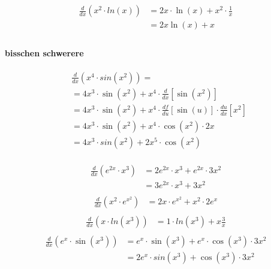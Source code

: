 \documentclass{book}
\begin{document}
\begin{multicols}{2}
\begin{align*}
\frac{d}{dx} (x^2 \cdot  ln(x)) &=2x \cdot \ln(x) + x^2 \cdot \frac{1}{x}\\
&=2x \ln(x) + x\\
\end{align*}
\paragraph{bisschen schwerere} %
\label{par:bisschen schwerere}

\begin{align*}
&\frac{d}{dx} (x^4 \cdot sin(x^2)) =\\
&=4x^3\cdot\sin(x^2)+x^4 \cdot \frac{d}{dx}\left[\sin(x^2)\right] \\
&=4x^3\cdot\sin(x^2)+x^4 \cdot \frac{df}{du}\left[\sin(u)\right] \cdot \frac{du}{dx}\left[x^2\right] \\
&=4x^3\cdot\sin(x^2)+x^4 \cdot \cos(x^2)\cdot 2x\\
&=4x^3 \cdot sin(x^2)+2x^5 \cdot \cos(x^2)\\
\end{align*}

\begin{align*}
\frac{d}{dx} (e^{2x} \cdot x^3) &=2e^{2x} \cdot x^3 + e^{2x} \cdot 3x^2 \\
                                &=3e^{2x} \cdot x^3 + 3x^2\\
\end{align*}
\begin{align*}
\frac{d}{dx} (x^2 \cdot  e^{x^2}) &=2x \cdot e^{x^2} + x^2 \cdot 2e^x\\
\end{align*}
\begin{align*}
\frac{d}{dx} (x \cdot  ln(x^3)) &=1 \cdot ln(x^3) + x \frac{3}{x}\\
\end{align*}
\begin{align*}
\frac{d}{dx} (e^x \cdot  \sin(x^3)) &=e^x \cdot \sin(x^3) + e^x \cdot \cos(x^3) \cdot 3x^2 \\
&=2e^x \cdot sin(x^3) + \cos(x^3) \cdot 3x^2\\
\end{align*}
\end{multicols}
\end{document}
